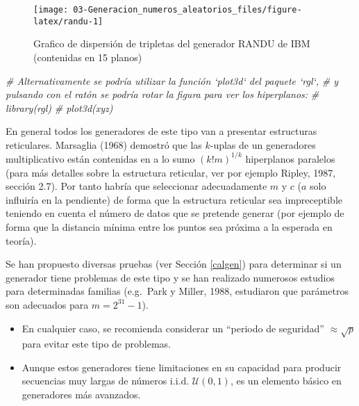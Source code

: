\documentclass[
]{book}
\newenvironment{Shaded}{\begin{snugshade}}{\end{snugshade}}
\newcommand{\CommentTok}[1]{\textcolor[rgb]{0.56,0.35,0.01}{\textit{#1}}}
\theoremstyle{break}
\theoremstyle{definition}
\theoremstyle{definition}
\theoremstyle{definition}
\theoremstyle{remark}
\begin{document}
\begin{figure}[!htb]

{\centering \texttt{[image: 03-Generacion\_numeros\_aleatorios\_files/figure-latex/randu-1]} 

}

\caption{Grafico de dispersión de tripletas del generador RANDU de IBM (contenidas en 15 planos)}\label{fig:randu}
\end{figure}

\begin{Shaded}
\begin{Highlighting}[]
\CommentTok{# Alternativamente se podría utilizar la función `plot3d` del paquete `rgl`,}
\CommentTok{# y pulsando con el ratón se podría rotar la figura para ver los hiperplanos:}
\CommentTok{# library(rgl)}
\CommentTok{# plot3d(xyz) }
\end{Highlighting}
\end{Shaded}

En general todos los generadores de este tipo van a presentar estructuras reticulares.
Marsaglia (1968) demostró que las \(k\)-uplas de un generadores multiplicativo están contenidas en a lo sumo \(\left(k!m\right)^{1/k}\) hiperplanos paralelos (para más detalles sobre la estructura reticular, ver por ejemplo Ripley, 1987, sección 2.7).
Por tanto habría que seleccionar adecuadamente \(m\) y \(c\) (\(a\) solo influiría en la pendiente) de forma que la estructura reticular sea impreceptible teniendo en cuenta el número de datos que se pretende generar (por ejemplo de forma que la distancia mínima entre los puntos sea próxima a la esperada en teoría).

Se han propuesto diversas pruebas (ver Sección \ref{calgen}) para
determinar si un generador tiene problemas de este tipo y se han
realizado numerosos estudios para determinadas familias (e.g.~Park y
Miller, 1988, estudiaron que parámetros son adecuados para \(m=2^{31}-1\)).

\begin{itemize}
\item
  En cualquier caso, se recomienda considerar un ``periodo de
  seguridad'' \(\approx \sqrt{p}\) para evitar este tipo de problemas.
\item
  Aunque estos generadores tiene limitaciones en su capacidad para
  producir secuencias muy largas de números i.i.d. \(\mathcal{U}(0,1)\),
  es un elemento básico en generadores más avanzados.
\end{itemize}
\end{document}

